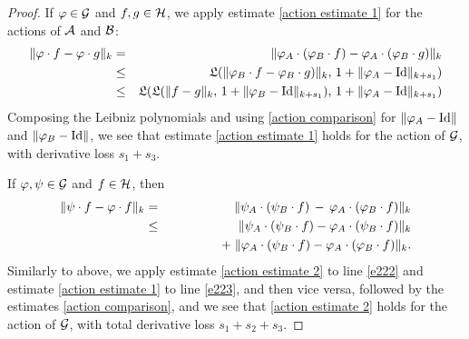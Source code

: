\documentclass{article}
\begin{document}
\begin{proof}
If $\varphi\in\mathcal{G}$ and $f,g \in \mathcal{H}$, we apply estimate \eqref{action estimate 1} for the actions of $\mathcal{A}$ and $\mathcal{B}$:
\begin{eqnarray*}
\|\varphi\cdot f - \varphi\cdot g\|_k &=& \|\varphi_A\cdot(\varphi_B\cdot f) - \varphi_A\cdot(\varphi_B\cdot g)\|_k \\
&\leq& \mathfrak{L}(\|\varphi_B\cdot f - \varphi_B\cdot g)\|_k,\, 1+\|\varphi_A-\textrm{Id}\|_{k+s_1}) \\
&\leq& \mathfrak{L}(\mathfrak{L}(\|f-g\|_k,\, 1+\|\varphi_B-\textrm{Id}\|_{k+s_1}),\, 1+\|\varphi_A-\textrm{Id}\|_{k+s_1})
\end{eqnarray*}
Composing the Leibniz polynomials and using \eqref{action comparison} for $\|\varphi_A-\textrm{Id}\|$ and $\|\varphi_B-\textrm{Id}\|$, we see that estimate \eqref{action estimate 1} holds for the action of $\mathcal{G}$, with derivative loss $s_1 + s_3$.

If $\varphi,\psi \in \mathcal{G}$ and $f \in \mathcal{H}$, then
\begin{eqnarray}
\|\psi\cdot f - \phi\cdot f\|_k &=& \|\psi_A\cdot(\psi_B\cdot f) \,-\, \phi_A\cdot(\phi_B\cdot f)\|_k \notag \\
&\leq& \|\psi_A\cdot(\psi_B\cdot f) - \phi_A\cdot(\psi_B\cdot f)\|_k \label{e222} \\
& & \qquad\qquad +\; \|\phi_A\cdot(\psi_B\cdot f) - \phi_A\cdot(\phi_B\cdot f)\|_k. \label{e223}
\end{eqnarray}
Similarly to above, we apply estimate \eqref{action estimate 2} to line \eqref{e222} and estimate \eqref{action estimate 1} to line \eqref{e223}, and then vice versa, followed by the estimates \eqref{action comparison}, and we see that \eqref{action estimate 2} holds for the action of $\mathcal{G}$, with total derivative loss $s_1 + s_2 + s_3$.
\end{proof}
\end{document}
